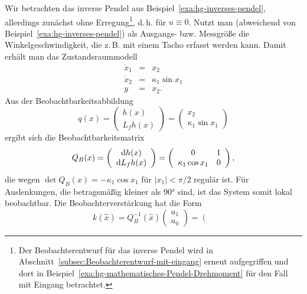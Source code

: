 \begin{example}
\label{exa:hg-mathematisches-Pendel-autonom}Wir betrachten das inverse
Pendel aus Beispiel~\ref{exa:hg-inverses-pendel}, allerdings zunächst
ohne Erregung\footnote{Der Beobachterentwurf für das inverse Pendel wird in Abschnitt~\ref{subsec:Beobachterentwurf-mit-eingang}
erneut aufgegriffen und dort in Beispiel~\ref{exa:hg-mathematisches-Pendel-Drehmoment}
für den Fall mit Eingang betrachtet.}, d.\,h. für $u\equiv0$. Nutzt man (abweichend von Beispiel~\ref{exa:hg-inverses-pendel})
als Ausgangs- bzw. Messgröße die Winkelgeschwindigkeit, die z.\,B.
mit einem Tacho erfasst werden kann. Damit erhält man das Zustands\-raum\-modell
\begin{equation}
\begin{array}{lcl}
\dot{x}_{1} & = & x_{2}\\
\dot{x}_{2} & = & \kappa_{1}\sin x_{1}\\
y & = & x_{2}.
\end{array}\label{eq:hg-math-pendel-autonom}
\end{equation}
Aus der Beobachtbarkeitsabbildung
\begin{equation}
q(x)=\left(\begin{array}{c}
h(x)\\
L_{f}h(x)
\end{array}\right)=\left(\begin{array}{c}
x_{2}\\
\kappa_{1}\sin x_{1}
\end{array}\right)\label{eq:hg-math-pendel-q}
\end{equation}
ergibt sich die Beobachtbarkeitsmatrix
\[
Q_{B}(x)=\left(\begin{array}{c}
{\mathrm{d}} h(x)\\
{\mathrm{d}} L_{f}h(x)
\end{array}\right)=\left(\begin{array}{cc}
0 & 1\\
\kappa_{1}\cos x_{1} & 0
\end{array}\right),
\]
die wegen $\det Q_{B}(x)=-\kappa_{1}\cos x_{1}$ für $|x_{1}|<\pi/2$
regulär ist. Für Auslenkungen, die betragsmäßig kleiner als $90\text{°}$
sind, ist das System somit lokal beobachtbar. Die Beobachterverstärkung
hat die Form 
\begin{equation}
k(\hat{x})=Q_{B}^{-1}(\hat{x})\left(\begin{array}{c}
a_{1}\\
a_{0}
\end{array}\right)=\left(\begin{array}{c}

\end{array}
\end{equation}
\end{example}
